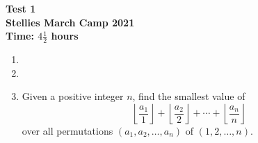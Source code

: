 \documentclass{article}
\begin{document}
\thispagestyle{empty}

\begin{center}
  \textbf{\Large Test 1}
  \\ \vspace{1em}
  \textbf{\large Stellies March Camp 2021}
  \\ \vspace{1em}
  \textbf{\large Time: $4\frac{1}{2}$ hours}
\end{center}

\vspace{24pt}

\begin{enumerate}[itemsep=12pt]

\item %


\item %


\item %
\newcommand{\floorf}[2]{\left\lfloor\frac{#1}{#2}\right\rfloor}
Given a positive integer $n$, find the smallest value of
\[ \floorf{a_1}{1} +\floorf{a_2}{2} +\dotsb +\floorf{a_n}{n} \]
over all permutations $(a_1, a_2, \dotsc, a_n)$ of $(1, 2, \dotsc, n)$.

\end{enumerate}

\vfill
\centering
\begin{BVerbatim}
\end{BVerbatim}
\end{document}
